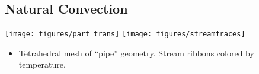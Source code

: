 \subsection*{Natural Convection}
\begin{frame}[t]
  \begin{center}
    \texttt{[image: figures/part\_trans]}
    \texttt{[image: figures/streamtraces]}
  \end{center}
  \begin{block}{}
    \begin{itemize}
    \item{
      Tetrahedral mesh of ``pipe'' geometry.
      Stream ribbons colored by temperature.
      }
      \end{itemize}
  \end{block}
\end{frame}

